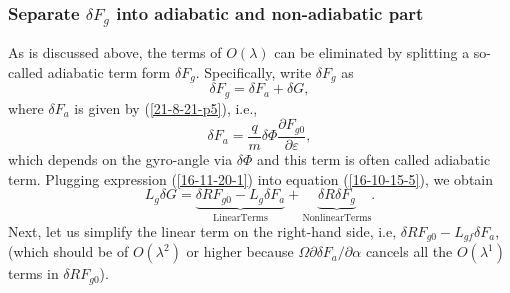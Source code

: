 \documentclass{article}
\newcommand{\tmop}[1]{\ensuremath{\operatorname{#1}}}
\begin{document}
\subsubsection{Separate $\delta F_g$ into adiabatic and non-adiabatic part}

As is discussed above, the terms of $O (\lambda)$ can be eliminated by
splitting a so-called adiabatic term form $\delta F_g$. Specifically, write
$\delta F_g$ as
\begin{equation}
  \label{16-11-20-1} \delta F_g = \delta F_a + \delta G,
\end{equation}
where $\delta F_a$ is given by (\ref{21-8-21-p5}), i.e.,
\begin{equation}
  \label{16-11-7-1} \delta F_a = \frac{q}{m} \delta \Phi \frac{\partial F_{g
  0}}{\partial \varepsilon},
\end{equation}
which depends on the gyro-angle via $\delta \Phi$ and this term is often
called adiabatic term. Plugging expression (\ref{16-11-20-1}) into equation
(\ref{16-10-15-5}), we obtain
\begin{equation}
  \label{16-10-14-1} L_g \delta G = \underbrace{\delta R F_{g 0} - L_g \delta
  F_a}_{\tmop{LinearTerms}} + \underbrace{\delta R \delta
  F_g}_{\tmop{NonlinearTerms}} .
\end{equation}
Next, let us simplify the linear term on the right-hand side, i.e, $\delta R
F_{g 0} - L_{g f} \delta F_a$, (which should be of $O (\lambda^2)$ or higher
because $\Omega \partial \delta F_a / \partial \alpha$ cancels all the $O
(\lambda^1)$ terms in $\delta R F_{g 0}$).
\end{document}
